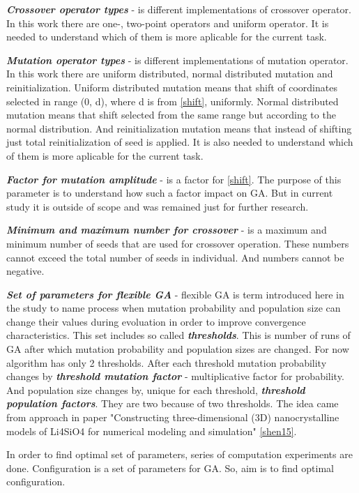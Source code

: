 \documentclass[12pt]{report}
\begin{document}
\textit{\textbf{Crossover operator types}} - is different implementations of crossover operator. In this work there are one-, two-point operators and uniform operator. It is needed to understand which of them is more aplicable for the current task.

\textit{\textbf{Mutation operator types}} - is different implementations of mutation operator. In this work there are uniform distributed, normal distributed mutation and reinitialization. Uniform distributed mutation means that shift of coordinates selected in range (0, d), where d is from \ref{shift}, uniformly. Normal distributed mutation means that shift selected from the same range but according to the normal distribution. And reinitialization mutation means that instead of shifting just total reinitialization of seed is applied. It is also needed to understand which of them is more aplicable for the current task.

\textit{\textbf{Factor for mutation amplitude}} - is a factor for \ref{shift}. The purpose of this parameter is to understand how such a factor impact on GA. But in current study it is outside of scope and was remained just for further research.

\textit{\textbf{Minimum and maximum number for crossover}} - is a maximum and minimum number of seeds that are used for crossover operation. These numbers cannot exceed the total number of seeds in individual. And numbers cannot be negative.

\textit{\textbf{Set of parameters for flexible GA}} - flexible GA is term introduced here in the study to name process when mutation probability and population size can change their values during evoluation in order to improve convergence characteristics. This set includes so called \textit{\textbf{thresholds}}. This is number of runs of GA after which mutation probability and population sizes are changed. For now algorithm has only 2 thresholds. After each threshold mutation probability changes by \textit{\textbf{threshold mutation factor}} - multiplicative factor for probability. And population size changes by, unique for each threshold, \textit{\textbf{threshold population factors}}. They are two because of two thresholds. The idea came from approach in paper "Constructing three-dimensional (3D) nanocrystalline models of Li4SiO4 for numerical modeling and simulation" \ref{shen15}.

In order to find optimal set of parameters, series of computation experiments are done. Configuration is a set of parameters for GA. So, aim is to find optimal configuration. 
\end{document}
